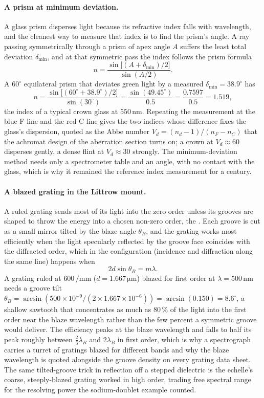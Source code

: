\paragraph{A prism at minimum deviation.} A glass prism disperses light because
its refractive index falls with wavelength, and the cleanest way to measure
that index is to find the prism's  angle. A ray
passing symmetrically through a prism of apex angle $A$ suffers the least total
deviation $\delta_{\min}$, and at that symmetric pass the index follows the
prism formula
\[
n = \frac{\sin\!\big[(A + \delta_{\min})/2\big]}{\sin(A/2)}.
\]
A $60^{\circ}$ equilateral prism that deviates green light by a measured
$\delta_{\min} = 38.9^{\circ}$ has
\[
n = \frac{\sin\!\big[(60^{\circ} + 38.9^{\circ})/2\big]}{\sin(30^{\circ})}
= \frac{\sin(49.45^{\circ})}{0.5} = \frac{0.7597}{0.5} = 1.519,
\]
the index of a typical crown glass at $550\,\si{\nano\meter}$. Repeating the
measurement at the blue F line and the red C line gives the two indices whose
difference fixes the glass's dispersion, quoted as the Abbe number
$V_{d} = (n_{d}-1)/(n_{F}-n_{C})$ that the achromat design of the aberration
section turns on; a crown at $V_{d}\approx 60$ disperses gently, a dense flint
at $V_{d}\approx 30$ strongly. The minimum-deviation method needs only a
spectrometer table and an angle, with no contact with the glass, which is why
it remained the reference index measurement for a century.

\paragraph{A blazed grating in the Littrow mount.} A ruled grating sends most of
its light into the zero order unless its grooves are shaped to throw the energy
into a chosen non-zero order, the . Each groove is cut as a small
mirror tilted by the blaze angle $\theta_B$, and the grating works most
efficiently when the light specularly reflected by the groove face coincides with
the diffracted order, which in the  configuration (incidence and
diffraction along the same line) happens when
\[
2 d\sin\theta_B = m\lambda .
\]
A grating ruled at $600\,\si{\per\milli\meter}$ ($d = 1.667\,\si{\micro\meter}$)
blazed for first order at $\lambda = 500\,\si{\nano\meter}$ needs a groove tilt
$\theta_B = \arcsin(500\times 10^{-9}/(2\times 1.667\times 10^{-6})) =
\arcsin(0.150) = 8.6^{\circ}$, a shallow sawtooth that concentrates as much as
$80\,\%$ of the light into the first order near the blaze wavelength rather than
the few percent a symmetric groove would deliver. The efficiency peaks at the
blaze wavelength and falls to half its peak roughly between
$\tfrac{2}{3}\lambda_B$ and $2\lambda_B$ in first order, which is why a
spectrograph carries a turret of gratings blazed for different bands and why the
blaze wavelength is quoted alongside the groove density on every grating data
sheet. The same tilted-groove trick in reflection off a stepped dielectric is the
echelle's coarse, steeply-blazed grating worked in high order, trading free
spectral range for the resolving power the sodium-doublet example counted.


